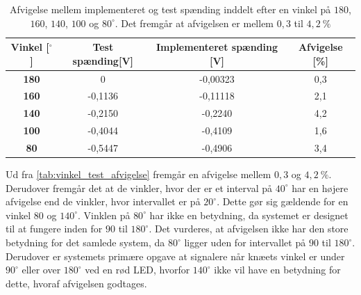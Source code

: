 \begin{table}[H]
\centering
\begin{tabular}{|c|c|c|c|}
\hline
\textbf{Vinkel {[}{$^{\circ}$}{]}} & \textbf{Test spænding{[}V{]}} & \textbf{Implementeret spænding {[}V{]}} & \textbf{Afvigelse {[}\%{]}} \\ \hline
\textbf{180}                    & 0                         & -0,00323                       & 0,3                      \\ \hline
\textbf{160}                    & -0,1136                   & -0,11118                       & 2,1                       \\ \hline
\textbf{140}                    & -0,2150                   & -0,2240                        & 4,2                   \\ \hline
\textbf{100}                    & -0,4044                   & -0,4109                        & 1,6                    \\ \hline
\textbf{80}                     & -0,5447                   & -0,4906                        & 3,4                    \\ \hline
\end{tabular}
\caption{Afvigelse mellem implementeret og test spænding inddelt efter en vinkel på $180$, $160$, $140$, $100$ og $80^{\circ}$. Det fremgår at afvigelsen er mellem $0,3$ til $4,2~\%$}
\label{tab:vinkel_test_afvigelse}
\end{table}

\noindent
Ud fra \autoref{tab:vinkel_test_afvigelse} fremgår en afvigelse mellem $0,3$ og $4,2~\%$. 
Derudover fremgår det at de vinkler, hvor der er et interval på $40^{\circ}$ har en højere afvigelse end de vinkler, hvor intervallet er på $20^{\circ}$. Dette gør sig gældende for en vinkel $80$ og $140^{\circ}$. Vinklen på $80^{\circ}$ har ikke en betydning, da systemet er designet til at fungere inden for $90$ til $180^{\circ}$.
Det vurderes, at afvigelsen ikke har den store betydning for det samlede system, da $80^{\circ}$ ligger uden for intervallet på $90$ til $180^{\circ}$. Derudover er systemets primære opgave at signalere når knæets vinkel er under $90^{\circ}$ eller over $180^{\circ}$ ved en rød LED, hvorfor $140^{\circ}$ ikke vil have en betydning for dette, hvoraf afvigelsen godtages. 

